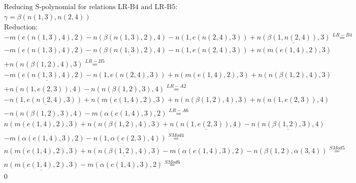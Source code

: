 \documentclass[11pt]{amsart}
\begin{document}
\begin{align*} 
& \text{Reducing S-polynomial for relations LR-B4 and LR-B5:} \\ 
& \gamma = \beta(n(1,3),n(2,4)) \\ 
& \text{Reduction}: \\& - m(e(n(1,3),4),2) - n(\beta(n(1,3),2),4) - n(1,e(n(2,4),3)) + \underline{n(\beta(1,n(2,4)),3)} \stackrel{ LR-B4 }{=}  \\ 
& - m(e(n(1,3),4),2) - \underline{n(\beta(n(1,3),2),4)} - n(1,e(n(2,4),3)) + n(m(e(1,4),2),3)\\ 
 &  + n(n(\beta(1,2),4),3) \stackrel{ LR-B5 }{=}  \\ 
& - \underline{m(e(n(1,3),4),2)} - n(1,e(n(2,4),3)) + n(m(e(1,4),2),3) + n(n(\beta(1,2),4),3)\\ 
 &  + n(n(1,e(2,3)),4) - n(n(\beta(1,2),3),4) \stackrel{ LR-A2 }{=}  \\ 
& - \underline{n(1,e(n(2,4),3))} + n(m(e(1,4),2),3) + n(n(\beta(1,2),4),3) + n(n(1,e(2,3)),4)\\ 
 &  - n(n(\beta(1,2),3),4) - m(\alpha(e(1,4),3),2) \stackrel{ LR-A6 }{=}  \\ 
&n(m(e(1,4),2),3) + n(n(\beta(1,2),4),3) + \underline{n(n(1,e(2,3)),4)} - \underline{n(n(\beta(1,2),3),4)}\\ 
 &  - m(\alpha(e(1,4),3),2) - n(1,\alpha(e(2,3),4)) \stackrel{ SMod4 }{=}  \\ 
&n(m(e(1,4),2),3) + \underline{n(n(\beta(1,2),4),3)} - m(\alpha(e(1,4),3),2) - n(\beta(1,2),\alpha(3,4)) \stackrel{ SMod5 }{=}  \\ 
&\underline{n(m(e(1,4),2),3)} - m(\alpha(e(1,4),3),2) \stackrel{ SMod6 }{=}  \\ 
&0\\ 
\end{align*} 
 
\end{document}
